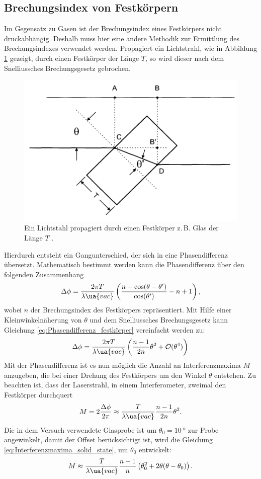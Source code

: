 \subsection{Brechungsindex von Festkörpern}
Im Gegensatz zu Gasen ist der Brechungsindex eines Festkörpers nicht druckabhängig.
Deshalb muss hier eine andere Methodik zur Ermittlung des Brechungsindexes verwendet werden.
Propagiert ein Lichtstrahl, wie in Abbildung \ref{fig:slag} gezeigt, durch einen Festkörper der Länge $T$,
so wird dieser nach dem Snelliussches Brechungsgesetz gebrochen.
\begin{figure}
\centering
\includegraphics[width=0.6\linewidth]{./content/images/slab.png}
\caption{Ein Lichtstahl propagiert durch einen Festkörper z.\,B. Glas der Länge $T$ \cite{anleitung64}.}
\label{fig:slag}
\end{figure}
Hierdurch entsteht ein Gangunterschied, der sich in eine Phasendifferenz übersetzt.
Mathematisch bestimmt werden kann die Phasendifferenz über den folgenden Zusammenhang
\begin{equation}
  \label{eq:Phasendifferenz_festkörper}
  \Delta\phi=\frac{ 2\pi T }{ \lambda\ua{vac} }\left( \frac{ n-\cos(\theta-\theta') }{ \cos(\theta') } - n+1\right),
\end{equation}
wobei $n$ der Brechungsindex des Festkörpers repräsentiert.
Mit Hilfe einer Kleinwinkelnäherung von $\theta$ und dem Snelliussches Brechungsgesetz kann
Gleichung \eqref{eq:Phasendifferenz_festkörper} vereinfacht werden zu:
\begin{equation}
  \Delta\phi=\frac{ 2\pi T }{ \lambda\ua{vac} }\left( \frac{ n-1 }{ 2n }\theta^2 + \mathcal{O}(\theta^4)\right)
\end{equation}
Mit der Phasendifferenz ist es nun möglich die Anzahl an Interferenzmaxima $M$ anzugeben, die bei einer Drehung
des Festkörpers um den Winkel $\theta$ entstehen. Zu beachten ist, dass der Laserstrahl, in einem Interferometer, zweimal den Festkörper durchquert
\begin{equation}
  \label{eq:Interferenzmaxima_solid_state}
  M=2\frac{\Delta\phi}{2\pi}\approx \frac{T}{\lambda\ua{vac}}\frac{n-1}{2n}\theta^2.
\end{equation}
Die in dem Versuch verwendete Glasprobe ist um $\theta_0 = \SI{10}{\degree}$ zur Probe angewinkelt,
damit der Offset berücksichtigt ist, wird die Gleichung \eqref{eq:Interferenzmaxima_solid_state},
um $\theta_0$ entwickelt:
\begin{equation}
\label{eq:entwicklung_interferenzmaxima}
  M\approx\frac{T}{\lambda\ua{vac}}\frac{n-1}{n}\left(\theta_0^2 + 2\theta(\theta-\theta_0)\right).
\end{equation}
